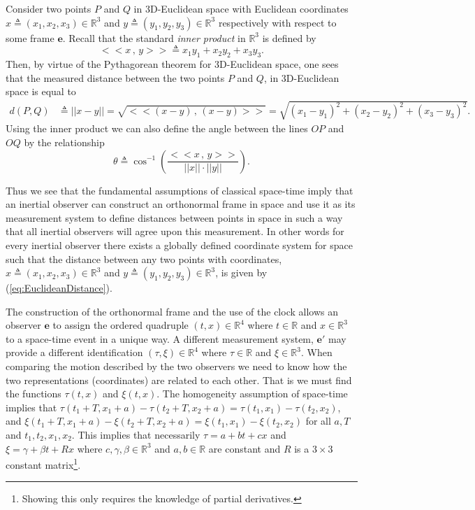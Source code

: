 \documentclass[graybox,envcountchap,sectrefs]{svmonoMuga}
\begin{document}
Consider two points $P$ and $Q$ in 3D-Euclidean space with Euclidean coordinates 
$x\triangleq (x_1,x_2,x_3)\in \mathbb{R}^3$ and $y\triangleq (y_1,y_2,y_3)\in \mathbb{R}^3$ respectively with respect to some frame $\mathbf{e}$.
Recall that the standard \textit{inner product} in $\mathbb{R}^3$ is defined by 
\[
<<x\,,\,y>>\triangleq x_1y_1+x_2y_2+x_3y_3.
\]
Then, by virtue of the Pythagorean theorem for 3D-Euclidean space, one sees that the measured distance between the two points $P$ and $Q$, in 3D-Euclidean space is equal to
\begin{align}
d(P,Q)&\triangleq ||x-y|| = \sqrt{<<(x-y)\,,\,(x-y)>>}=\sqrt{(x_1-y_1)^2+(x_2-y_2)^2+(x_3-y_3)^2}.\label{eq:EuclideanDistance}
\end{align}
Using the inner product we can also  define the angle between the lines $OP$ and $OQ$ by the relationship
\[
\theta \triangleq \cos^{-1}\left(\frac{<<x\,,\,y>>}{||x||\cdot ||y||}\right).
\]

\begin{svgraybox}
Thus we see that the fundamental assumptions of classical space-time imply that an inertial observer can construct an orthonormal frame in space and use it as its measurement system to define distances between points in space in such a way that all inertial observers will agree upon this measurement. In other words for every inertial observer there exists a globally defined coordinate system for space such that the distance between any two points with coordinates, $x\triangleq (x_1,x_2,x_3)\in \mathbb{R}^3$ and $y\triangleq (y_1,y_2,y_3)\in \mathbb{R}^3$, is given by (\ref{eq:EuclideanDistance}).
\end{svgraybox}
The construction of the orthonormal frame and the use of the clock allows an observer $\mathbf{e}$ to assign the ordered quadruple $(t,x)\in \mathbb{R}^4$ where $t\in \mathbb{R}$ and  $x\in \mathbb{R}^3$ to a space-time event in a unique way. A different measurement system, $\mathbf{e}'$ may provide a different identification  $(\tau,\xi)\in \mathbb{R}^4$ where $\tau\in \mathbb{R}$ and  $\xi\in \mathbb{R}^3$. When comparing the motion described by the two observers we need to know how the two representations (coordinates) are related to each other.  That is we must find the functions $\tau(t,x)$ and $\xi(t,x)$.
The homogeneity assumption of space-time implies that $\tau(t_1+T,x_1+a)-\tau(t_2+T,x_2+a)=\tau(t_1,x_1)-\tau(t_2,x_2)$, and $\xi(t_1+T,x_1+a)-\xi(t_2+T,x_2+a)=\xi(t_1,x_1)-\xi(t_2,x_2)$ for all $a, T$ and $t_1,t_2,x_1,x_2$. This implies that necessarily $\tau=a+b t+c x$ and $\xi=\gamma+\beta t+R x$ where $c,\gamma, \beta\in \mathbb{R}^3$ and $a,b\in \mathbb{R}$ are constant and $R$ is a $3\times 3$ constant matrix\footnote{Showing this only requires the knowledge of partial derivatives.}.
 
\end{document}
